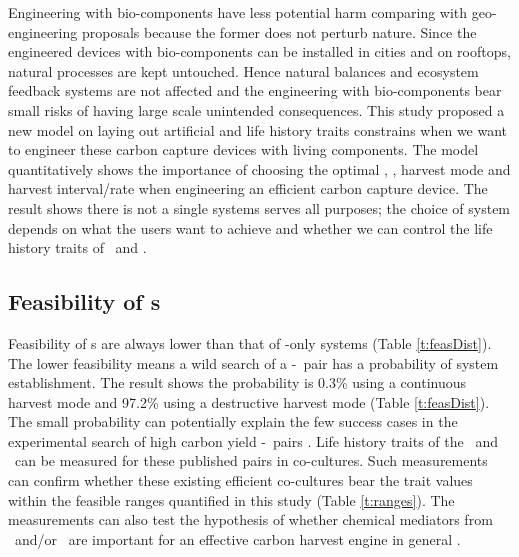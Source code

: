 \documentclass[../thesis.tex]{subfiles} %
\begin{document}
Engineering with bio-components have less potential harm comparing with geo-engineering proposals because the former does not perturb nature.  Since the engineered devices with bio-components can be installed in cities and on rooftops, natural processes are kept untouched.  Hence natural balances and ecosystem feedback systems are not affected and the engineering with bio-components bear small risks of having large scale unintended consequences.  This study proposed a new model on laying out artificial and life history traits constrains when we want to engineer these carbon capture devices with living components.  The model quantitatively shows the importance of choosing the optimal \phy, \bac, harvest mode and harvest interval/rate when engineering an efficient carbon capture device.  The result shows there is not a single systems serves all purposes; the choice of system depends on what the users want to achieve and whether we can control the life history traits of \phy\ and \bac.

\subsection{Feasibility of \pbs s}
Feasibility of \pbs s are always lower than that of \phy-only systems (Table \ref{t:feasDist}).  The lower feasibility means a wild search of a \phy-\bac\ pair has a probability of system establishment.  The result shows the probability is 0.3\% using a continuous harvest mode and 97.2\% using a destructive harvest mode (Table \ref{t:feasDist}).  The small probability can potentially explain the few success cases in the experimental search of high carbon yield \phy-\bac\ pairs \autocite{fuentes2016impact}.  Life history traits of the \phy\ and \bac\ can be measured for these published pairs in co-cultures.  Such measurements can confirm whether these existing efficient co-cultures bear the trait values within the feasible ranges quantified in this study (Table \ref{t:ranges}).  The measurements can also test the hypothesis of whether chemical mediators from \phy\ and/or \bac\ are important for an effective carbon harvest engine in general \autocite{rivas2010interactions,amin2009photolysis,fuentes2016impact}.
\end{document}
